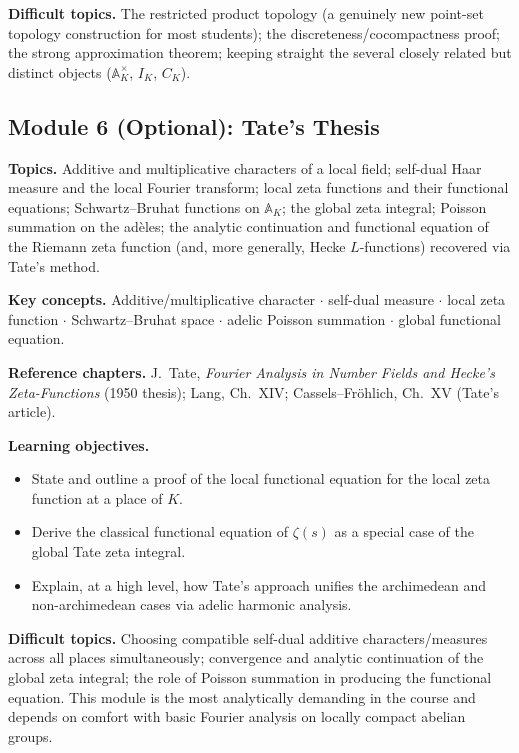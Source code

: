 \documentclass[11pt]{article}
\begin{document}
\textbf{Difficult topics.} The restricted product topology (a genuinely new point-set topology construction for most students); the discreteness/cocompactness proof; the strong approximation theorem; keeping straight the several closely related but distinct objects ($\mathbb{A}_K^\times$, $I_K$, $C_K$).

\subsection*{Module 6 (Optional): Tate's Thesis}
\textbf{Topics.} Additive and multiplicative characters of a local field; self-dual Haar measure and the local Fourier transform; local zeta functions and their functional equations; Schwartz--Bruhat functions on $\mathbb{A}_K$; the global zeta integral; Poisson summation on the adèles; the analytic continuation and functional equation of the Riemann zeta function (and, more generally, Hecke $L$-functions) recovered via Tate's method.

\textbf{Key concepts.} Additive/multiplicative character $\cdot$ self-dual measure $\cdot$ local zeta function $\cdot$ Schwartz--Bruhat space $\cdot$ adelic Poisson summation $\cdot$ global functional equation.

\textbf{Reference chapters.} J.\ Tate, \emph{Fourier Analysis in Number Fields and Hecke's Zeta-Functions} (1950 thesis); Lang, Ch.~XIV; Cassels--Fröhlich, Ch.~XV (Tate's article).

\textbf{Learning objectives.}
\begin{itemize}[leftmargin=*]
  \item State and outline a proof of the local functional equation for the local zeta function at a place of $K$.
  \item Derive the classical functional equation of $\zeta(s)$ as a special case of the global Tate zeta integral.
  \item Explain, at a high level, how Tate's approach unifies the archimedean and non-archimedean cases via adelic harmonic analysis.
\end{itemize}

\textbf{Difficult topics.} Choosing compatible self-dual additive characters/measures across all places simultaneously; convergence and analytic continuation of the global zeta integral; the role of Poisson summation in producing the functional equation. This module is the most analytically demanding in the course and depends on comfort with basic Fourier analysis on locally compact abelian groups.
\end{document}
